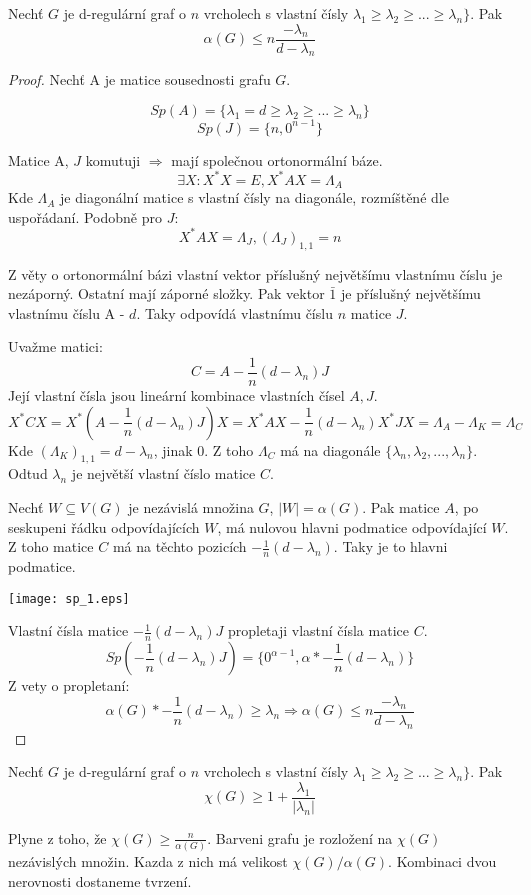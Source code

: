 \begin{theorem}
	Nechť $G$ je d-regulární graf o $n$ vrcholech s vlastní čísly $\lambda_1 \geq \lambda_2 \geq ... \geq \lambda_n \}$. Pak
	\[ \alpha(G) \leq n \frac{-\lambda_n}{d - \lambda_n} \]
\end{theorem}
\begin{proof}
	Nechť A je matice sousednosti grafu $G$.

	\[ Sp(A) = \{\lambda_1 = d \geq \lambda_2 \geq ... \geq \lambda_n \} \]
	\[ Sp(J) = \{n, 0^{n-1} \} \]

	Matice A, $J$ komutuji $\Rightarrow$ mají společnou ortonormální báze.
	\[ \exists X: X^{\ast}X = E, X^{\ast}AX = \Lambda_A \]
	Kde $\Lambda_A$ je diagonální matice s vlastní čísly na diagonále, rozmíštěné dle uspořádaní.
	Podobně pro $J$:
	\[ X^{\ast}AX = \Lambda_J, (\Lambda_J)_{1,1} = n \]

	Z věty o ortonormální bázi vlastní vektor příslušný největšímu vlastnímu číslu je nezáporný. Ostatní mají záporné složky.
	Pak vektor $\bar{1}$ je příslušný největšímu vlastnímu číslu A - $d$.
	Taky odpovídá vlastnímu číslu $n$ matice $J$.

 	Uvažme matici:
	\[ C = A - \frac{1}{n}(d - \lambda_n)J \]
	Její vlastní čísla jsou lineární kombinace vlastních čísel $A, J$.
	\[ X^{\ast}CX = X^{\ast}(A - \frac{1}{n}(d - \lambda_n)J)X = X^{\ast}AX - \frac{1}{n}(d - \lambda_n)X^{\ast}JX = \Lambda_A - \Lambda_K = \Lambda_C \]
	Kde $(\Lambda_K)_{1,1} = d - \lambda_n$, jinak 0. Z toho $\Lambda_C$ má na diagonále $\{ \lambda_n, \lambda_2,..., \lambda_n \}$.
	Odtud $\lambda_n$ je největší vlastní číslo matice $C$.

	Nechť $W \subseteq V(G)$ je nezávislá množina $G$, $|W| = \alpha(G)$. Pak matice $A$, po seskupeni řádku odpovídajících $W$, má nulovou hlavni podmatice odpovídající $W$.
	Z toho matice $C$ má na těchto pozicích $-\frac{1}{n}(d - \lambda_n)$. Taky je to hlavni podmatice.

	\texttt{[image: sp\_1.eps]}

	Vlastní čísla matice $-\frac{1}{n}(d - \lambda_n)J$ propletaji vlastní čísla matice $C$.
	\[ Sp\left(-\frac{1}{n}(d - \lambda_n)J\right) = \{0^{\alpha - 1}, \alpha * -\frac{1}{n}(d - \lambda_n) \} \]
	Z vety o propletaní:
	\[ \alpha(G) * -\frac{1}{n}(d - \lambda_n) \geq \lambda_n \Rightarrow \alpha(G) \leq n \frac{-\lambda_n}{d - \lambda_n} \]
\end{proof}

\begin{consequence}\label{coloring_1}
	Nechť $G$ je d-regulární graf o $n$ vrcholech s vlastní čísly $\lambda_1 \geq \lambda_2 \geq ... \geq \lambda_n \}$. Pak
	\[ \chi(G) \geq 1 + \frac{\lambda_1}{|\lambda_n|} \]

	Plyne z toho, že $ \chi(G) \geq \frac{n}{\alpha(G)}$. Barveni grafu je rozložení na $\chi(G)$ nezávislých množin. Kazda z nich má velikost $\chi(G)/\alpha(G)$. Kombinaci dvou nerovnosti dostaneme tvrzení.
\end{consequence}

